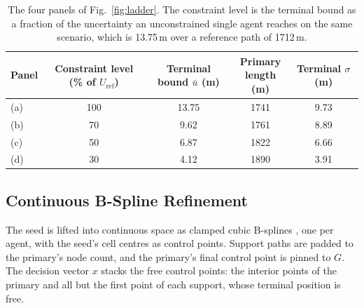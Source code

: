 \documentclass[letterpaper, 10 pt, conference]{ieeeconf}
\theoremstyle{remark}
\begin{document}
\begin{table}[t]
  \centering
  \footnotesize
  \setlength{\tabcolsep}{5pt}
  \begin{tabular}{@{}lcccc@{}}
    \toprule
    Panel & \makecell{Constraint level\\(\% of $U_\mathrm{ref}$)}
          & \makecell{Terminal\\bound $\bar{u}$ (m)}
          & \makecell{Primary\\length (m)}
          & \makecell{Terminal\\$\sigma$ (m)} \\
    \midrule
    (a) & 100 & 13.75 & 1741 & 9.73 \\
    (b) &  70 &  9.62 & 1761 & 8.89 \\
    (c) &  50 &  6.87 & 1822 & 6.66 \\
    (d) &  30 &  4.12 & 1890 & 3.91 \\
    \bottomrule
  \end{tabular}
  \caption{The four panels of Fig.~\ref{fig:ladder}. The constraint level is
    the terminal bound as a fraction of the uncertainty an unconstrained
    single agent reaches on the same scenario, which is 13.75\,m over a
    reference path of 1712\,m.}
  \label{tab:ladder}
\end{table}

\subsection{Continuous B-Spline Refinement}
\label{sec:cont}

The seed is lifted into continuous space as clamped cubic B-splines
\cite{piegl1997nurbs}, one per agent, with the seed's cell centres as control points. Support paths are padded to the primary's node count, and
the primary's final control point is pinned to $G$. The decision vector $x$
stacks the free control points: the interior points of the primary and all
but the first point of each support, whose terminal position is free.
\end{document}
